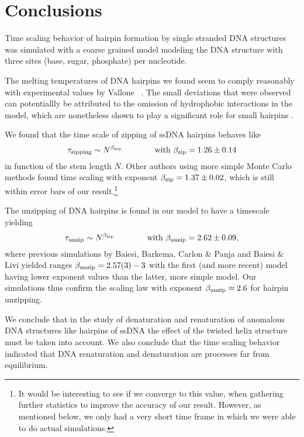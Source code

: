 \section{Conclusions}

Time scaling behavior of hairpin formation by single stranded DNA structures was simulated with a coarse grained model modeling the DNA structure with three sites (base, sugar, phosphate) per nucleotide.

The melting temperatures of DNA hairpins we found seem to comply reasonably with experimental values by Vallone \etal\ \cite{vallone1999melting}. The small deviations that were observed can potentiallly be attributed to the omission of hydrophobic interactions in the model, which are nonetheless shown to play a significant role for small hairpins \cite{kuznetsov2001semiflexible}.

We found that the time scale of zipping of ssDNA hairpins behaves like
\begin{equation}
\tau_\text{zipping} \sim N^{{\beta_\text{zip}}} \qquad \qquad \text{with}\ {\beta_\text{zip}} = 1.26\pm0.14
\end{equation}
in function of the stem length $N$. Other authors using more simple Monte Carlo methods found time scaling with exponent ${\beta_\text{zip}} = 1.37 \pm 0.02$, which is still within error bars of our result.\footnote{It would be interesting to see if we converge to this value, when gathering further statistics to improve the accuracy of our result. However, as mentioned below, we only had a very short time frame in which we were able to do actual simulations.}

The unzipping of DNA hairpins is found in our model to have a timescale yielding
\begin{equation}
{\ensuremath{\tau_\text{unzip}}} \sim N^{{\beta_\text{zip}}} \qquad \qquad \text{with}\ {\beta_\text{unzip}} = 2.62\pm0.09,
\end{equation}
where previous simulations by Baiesi, Barkema, Carlon \& Panja \cite{carlon2010unwinding} and Baiesi \& Livi \cite{baiesi2009multiple} yielded ranges ${\beta_\text{unzip}} = 2.57(3) - 3$ with the first (and more recent) model having lower exponent values than the latter, more simple model. Our simulations thus confirm the scaling law with exponent ${\beta_\text{unzip}} \approx 2.6$ for hairpin unzipping.

We conclude that in the study of denaturation and renaturation of anomalous DNA structures like hairpins of ssDNA the effect of the twisted helix structure must be taken into account. We also conclude that the time scaling behavior indicated that DNA renaturation and denaturation are processes far from equilibrium.

